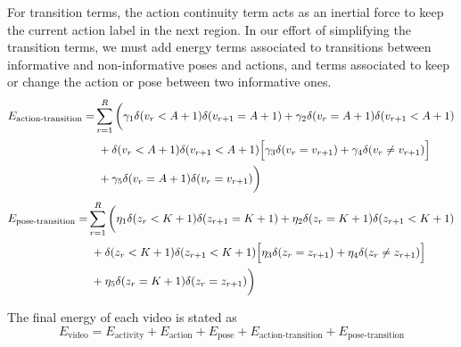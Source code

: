 \documentclass[10pt,letterpaper]{article}
\newcommand{\+}[1]{\ensuremath{{\boldsymbol #1}}}
\begin{document}
For transition terms, the action continuity term acts as an inertial force to keep the current action label in the next region. In our effort of simplifying the transition terms, we must add energy terms associated to transitions between informative and non-informative poses and actions, and terms associated to keep or change the action or pose between two informative ones.    
\begin{equation}
\begin{split}
E_{\text{action-transition}} =& \sum_{r=1}^R \left( \gamma_1 \delta(v_r<A+1)\delta(v_{r+1}=A+1)
+ \gamma_2\delta(v_r=A+1)\delta(v_{r+1}<A+1) \vphantom{\frac{1}{2}}\right. \\
& \left. \vphantom{\frac{1}{2}} + \delta(v_r<A+1)\delta(v_{r+1}<A+1) \Big[ \gamma_3 \delta(v_r=v_{r+1}) + \gamma_4 \delta(v_r \neq v_{r+1})\Big] \right.\\
& \left. \vphantom{\frac{1}{2}} + \gamma_5 \delta(v_r = A+1)\delta(v_r = v_{r+1})\right)
\end{split}
\end{equation}
\begin{equation}
\begin{split}
E_{\text{pose-transition}} =& \sum_{r=1}^R \left( \eta_1 \delta(z_r<K+1)\delta(z_{r+1}=K+1)
+ \eta_2\delta(z_r=K+1)\delta(z_{r+1}<K+1) \vphantom{\frac{1}{2}}\right. \\
& \left. \vphantom{\frac{1}{2}} + \delta(z_r<K+1)\delta(z_{r+1}<K+1) \Big[ \eta_3 \delta(z_r=z_{r+1}) + \eta_4 \delta(z_r \neq z_{r+1})\Big] \right.\\
& \left. \vphantom{\frac{1}{2}} + \eta_5 \delta(z_r = K+1)\delta(z_r = z_{r+1})\right)
\end{split}
\end{equation}

The final energy of each video is stated as
\begin{equation}
E_{\text{video}} = E_{\text{activity}} + E_{\text{action}} + E_{\text{pose}}+ E_{\text{action-transition}}+ E_{\text{pose-transition}}
\end{equation}
\end{document}
